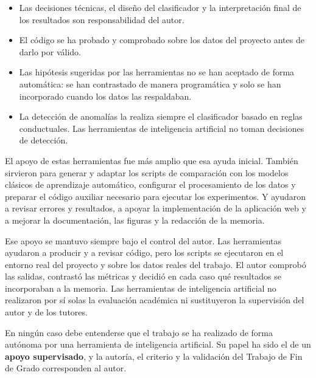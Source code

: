 \begin{itemize}
  \item Las decisiones técnicas, el diseño del clasificador y la interpretación final de los resultados son responsabilidad del autor.
  \item El código se ha probado y comprobado sobre los datos del proyecto antes de darlo por válido.
  \item Las hipótesis sugeridas por las herramientas no se han aceptado de forma automática: se han contrastado de manera programática y solo se han incorporado cuando los datos las respaldaban.
  \item La detección de anomalías la realiza siempre el clasificador basado en reglas conductuales. Las herramientas de inteligencia artificial no toman decisiones de detección.
\end{itemize}

El apoyo de estas herramientas fue más amplio que esa ayuda inicial. También sirvieron para generar y adaptar los scripts de comparación con los modelos clásicos de aprendizaje automático, configurar el procesamiento de los datos y preparar el código auxiliar necesario para ejecutar los experimentos. Y ayudaron a revisar errores y resultados, a apoyar la implementación de la aplicación web y a mejorar la documentación, las figuras y la redacción de la memoria.

Ese apoyo se mantuvo siempre bajo el control del autor. Las herramientas ayudaron a producir y a revisar código, pero los scripts se ejecutaron en el entorno real del proyecto y sobre los datos reales del trabajo. El autor comprobó las salidas, contrastó las métricas y decidió en cada caso qué resultados se incorporaban a la memoria. Las herramientas de inteligencia artificial no realizaron por sí solas la evaluación académica ni sustituyeron la supervisión del autor y de los tutores.

En ningún caso debe entenderse que el trabajo se ha realizado de forma autónoma por una herramienta de inteligencia artificial. Su papel ha sido el de un \textbf{apoyo supervisado}, y la autoría, el criterio y la validación del Trabajo de Fin de Grado corresponden al autor.

